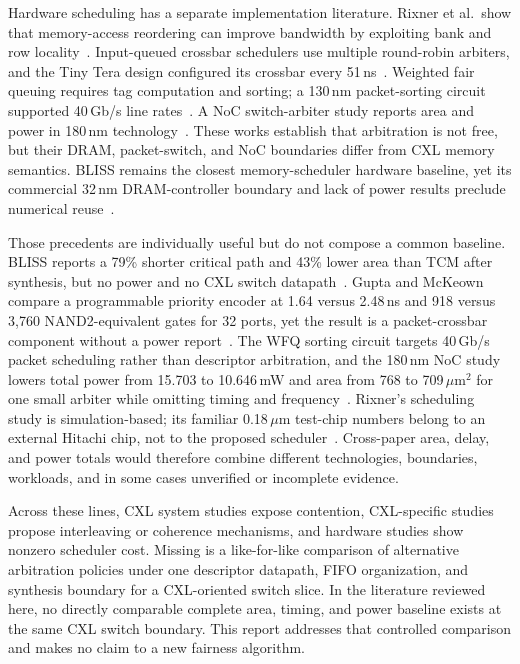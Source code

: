 Hardware scheduling has a separate implementation literature. Rixner et al.\ show that memory-access reordering can improve bandwidth by exploiting bank and row locality~\cite{rixner}. Input-queued crossbar schedulers use multiple round-robin arbiters, and the Tiny Tera design configured its crossbar every 51\,ns~\cite{gupta}. Weighted fair queuing requires tag computation and sorting; a 130\,nm packet-sorting circuit supported 40\,Gb/s line rates~\cite{wfq_sort}. A NoC switch-arbiter study reports area and power in 180\,nm technology~\cite{arbiter_ppa}. These works establish that arbitration is not free, but their DRAM, packet-switch, and NoC boundaries differ from CXL memory semantics. BLISS remains the closest memory-scheduler hardware baseline, yet its commercial 32\,nm DRAM-controller boundary and lack of power results preclude numerical reuse~\cite{bliss}.

Those precedents are individually useful but do not compose a common baseline. BLISS reports a 79\% shorter critical path and 43\% lower area than TCM after synthesis, but no power and no CXL switch datapath~\cite{bliss}. Gupta and McKeown compare a programmable priority encoder at 1.64 versus 2.48\,ns and 918 versus 3,760 NAND2-equivalent gates for 32 ports, yet the result is a packet-crossbar component without a power report~\cite{gupta}. The WFQ sorting circuit targets 40\,Gb/s packet scheduling rather than descriptor arbitration, and the 180\,nm NoC study lowers total power from 15.703 to 10.646\,mW and area from 768 to 709\,$\mu$m$^2$ for one small arbiter while omitting timing and frequency~\cite{wfq_sort,arbiter_ppa}. Rixner's scheduling study is simulation-based; its familiar 0.18\,$\mu$m test-chip numbers belong to an external Hitachi chip, not to the proposed scheduler~\cite{rixner}. Cross-paper area, delay, and power totals would therefore combine different technologies, boundaries, workloads, and in some cases unverified or incomplete evidence.

Across these lines, CXL system studies expose contention, CXL-specific studies propose interleaving or coherence mechanisms, and hardware studies show nonzero scheduler cost. Missing is a like-for-like comparison of alternative arbitration policies under one descriptor datapath, FIFO organization, and synthesis boundary for a CXL-oriented switch slice. In the literature reviewed here, no directly comparable complete area, timing, and power baseline exists at the same CXL switch boundary. This report addresses that controlled comparison and makes no claim to a new fairness algorithm.

